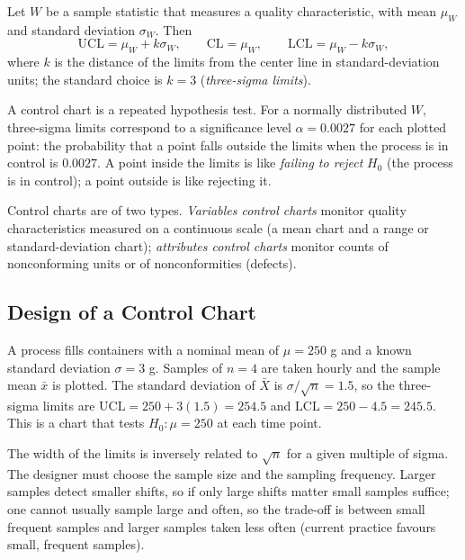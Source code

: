 \begin{definition}
Let $W$ be a sample statistic that measures a quality characteristic, with mean $\mu_W$ and standard deviation $\sigma_W$. Then
\[ \mathrm{UCL}=\mu_W+k\sigma_W,\qquad\mathrm{CL}=\mu_W,\qquad\mathrm{LCL}=\mu_W-k\sigma_W, \]
where $k$ is the distance of the limits from the center line in standard-deviation units; the standard choice is $k=3$ (\emph{three-sigma limits}).
\end{definition}

A control chart is a repeated hypothesis test. For a normally distributed $W$, three-sigma limits correspond to a significance level $\alpha=0.0027$ for each plotted point: the probability that a point falls outside the limits when the process is in control is $0.0027$. A point inside the limits is like \emph{failing to reject} $H_0$ (the process is in control); a point outside is like rejecting it.

Control charts are of two types. \emph{Variables control charts} monitor quality characteristics measured on a continuous scale (a mean chart and a range or standard-deviation chart); \emph{attributes control charts} monitor counts of nonconforming units or of nonconformities (defects).

\subsection{Design of a Control Chart}

\begin{example}\label{ex:xbardesign}
A process fills containers with a nominal mean of $\mu=250$ g and a known standard deviation $\sigma=3$ g. Samples of $n=4$ are taken hourly and the sample mean $\bar{x}$ is plotted. The standard deviation of $\bar{X}$ is $\sigma/\sqrt n=1.5$, so the three-sigma limits are $\mathrm{UCL}=250+3(1.5)=254.5$ and $\mathrm{LCL}=250-4.5=245.5$. This is a chart that tests $H_0:\mu=250$ at each time point.
\end{example}

The width of the limits is inversely related to $\sqrt n$ for a given multiple of sigma. The designer must choose the sample size and the sampling frequency. Larger samples detect smaller shifts, so if only large shifts matter small samples suffice; one cannot usually sample large and often, so the trade-off is between small frequent samples and larger samples taken less often (current practice favours small, frequent samples).

